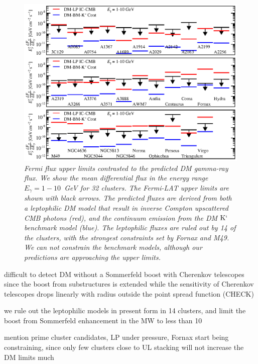 \documentclass[10pt,aps,pra,reprint,amsmath,amsfonts,amssymb,showpacs]{revtex4-1}
\newcommand{\rmn}{\mathrm}
\newcommand{\Kp}{\rmn{K}`}
\begin{document}
\begin{figure}
\begin{minipage}{2.0\columnwidth}
  \includegraphics[width=0.99\columnwidth]{figures/Fermi.comp.DM.eps}
  \caption{\it Fermi flux upper limits contrasted to the predicted DM
    gamma-ray flux. We show the mean differential flux in the energy
    range $E_\gamma=1-10$~GeV for 32 clusters. The Fermi-LAT upper
    limits are shown with black arrows. The predicted fluxes are
    derived from both a leptophilic DM model that result in inverse
    Compton upscattered CMB photons (red), and the continuum emission
    from the DM $\Kp$ benchmark model (blue). The leptophilic fluxes
    are ruled out by 14 of the clusters, with the strongest
    constraints set by Fornax and M49. We can not constrain the
    benchmark models, although our predictions are approaching the
    upper limits.}
 \label{fig14}
\end{minipage}
\end{figure}
 difficult to detect DM without a Sommerfeld boost with Cherenkov
 telescopes since the boost from substructures is extended while the
 sensitivity of Cherenkov telescopes drops linearly with radius
 outside the point spread function (CHECK)

we rule out the leptophilic models in present form in 14 clusters,
 and limit the boost from Sommerfeld enhancement in the MW to less
 than 10

mention prime cluster candidates, LP under pressure, Fornax start
being constraining, since only few clusters close to UL stacking will
not increase the DM limits much
\end{document}
